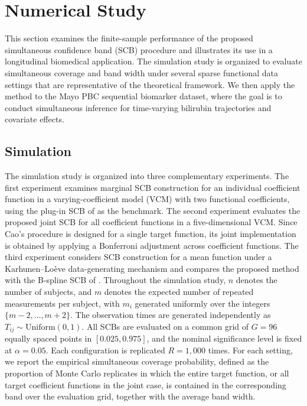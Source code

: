 \section{Numerical Study}
\label{sec:numerical-study}

This section examines the finite-sample performance of the proposed
simultaneous confidence band (SCB) procedure and illustrates its use in a
longitudinal biomedical application. The simulation study is organized to
evaluate simultaneous coverage and band width under several sparse functional
data settings that are representative of the theoretical framework. We then
apply the method to the Mayo PBC sequential biomarker dataset, where the goal is
to conduct simultaneous inference for time-varying bilirubin trajectories and
covariate effects.

\subsection{Simulation}
\label{subsec:simulation}

The simulation study is organized into three complementary experiments. The
first experiment examines marginal SCB construction for an individual
coefficient function in a varying-coefficient model (VCM) with two functional
coefficients, using the plug-in SCB of \citet{Cao2018} as the
benchmark. The second experiment evaluates the proposed joint SCB for all
coefficient functions in a five-dimensional VCM. Since Cao's procedure is
designed for a single target function, its joint implementation is obtained by
applying a Bonferroni adjustment across coefficient functions. The third
experiment considers SCB construction for a mean function under a
Karhunen--Lo\`eve data-generating mechanism and compares the proposed method
with the B-spline SCB of \citet{CaiHu2025}. Throughout the
simulation study, \(n\) denotes the number of subjects, and \(m\) denotes the
expected number of repeated measurements per subject, with \(m_i\) generated
uniformly over the integers \(\{m-2,\ldots,m+2\}\). The observation times are
generated independently as \(T_{ij}\sim \mathrm{Uniform}(0,1)\). All SCBs are
evaluated on a common grid of \(G=96\) equally spaced points in
\([0.025,0.975]\), and the nominal significance level is fixed at
\(\alpha=0.05\). Each configuration is replicated \(R=1{,}000\) times. For each
setting, we report the empirical simultaneous coverage probability, defined as
the proportion of Monte Carlo replicates in which the entire target function,
or all target coefficient functions in the joint case, is contained in the
corresponding band over the evaluation grid, together with the average band
width.

